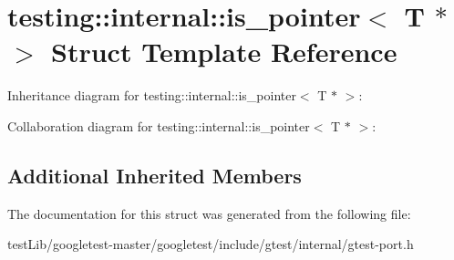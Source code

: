 \hypertarget{structtesting_1_1internal_1_1is__pointer_3_01T_01_5_01_4}{}\section{testing\+:\+:internal\+:\+:is\+\_\+pointer$<$ T $\ast$ $>$ Struct Template Reference}
\label{structtesting_1_1internal_1_1is__pointer_3_01T_01_5_01_4}


Inheritance diagram for testing\+:\+:internal\+:\+:is\+\_\+pointer$<$ T $\ast$ $>$\+:


Collaboration diagram for testing\+:\+:internal\+:\+:is\+\_\+pointer$<$ T $\ast$ $>$\+:
\subsection*{Additional Inherited Members}


The documentation for this struct was generated from the following file\+:\begin{DoxyCompactItemize}
\item 
test\+Lib/googletest-\/master/googletest/include/gtest/internal/gtest-\/port.\+h\end{DoxyCompactItemize}
